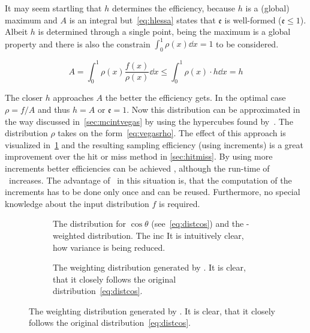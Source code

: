 It may seem startling that \(h\) determines the efficiency, because
\(h\) is a (global) maximum and \(A\) is an integral
but~\eqref{eq:hlessa} states that \(\mathfrak{e}\) is well-formed
(\(\mathfrak{e}\leq 1\)). Albeit \(h\) is determined through a single
point, being the maximum is a global property and there is also the
constrain \(\int_0^1\rho(x)\dd{x}=1\) to be considered.

\begin{equation}
  \label{eq:hlessa}
  A = \int_0^1\rho(x)\frac{f(x)}{\rho(x)}\dd{x} \leq
  \int_0^1\rho(x)\cdot h\dd{x} = h
\end{equation}


The closer \(h\) approaches \(A\) the better the efficiency gets. In
the optimal case \(\rho=f/A\) and thus \(h=A\) or
\(\mathfrak{e} = 1\). Now this distribution can be approximated in the
way discussed in~\ref{sec:mcintvegas} by using the hypercubes found
by~\vegas. The distribution \(\rho\) takes on the
form~\eqref{eq:vegasrho}. The effect of this approach is visualized
in~\ref{fig:vegasdist} and the resulting sampling efficiency
 (using
 increments) is a great
improvement over the hit or miss method in \ref{sec:hitmiss}. By using
more increments better efficiencies can be achieved , although the
run-time of \vegas\ increases. The advantage of \vegas\ in this
situation is, that the computation of the increments has to be done
only once and can be reused. Furthermore, no special knowledge about
the input distribution \(f\) is required.


\begin{figure}[ht]
  \centering
  \begin{subfigure}{.49\textwidth}
    \caption[The distribution for \(\cos\theta\), derived from the
    differential cross-section and the \vegas-weighted
    distribution]{\label{fig:vegasdist} The distribution for
      \(\cos\theta\) (see~\eqref{eq:distcos}) and the \vegas-weighted
      distribution. The inc It is intuitively clear, how variance is
      being reduced.}
  \end{subfigure}
  \begin{subfigure}{.49\textwidth}
    \caption[The weighting distribution generated by
    \vegas.]{\label{fig:vegasrho} The weighting distribution generated by
    \vegas. It is clear, that it closely follows the original
    distribution~\eqref{eq:distcos}.}
  \end{subfigure}
\end{figure}


